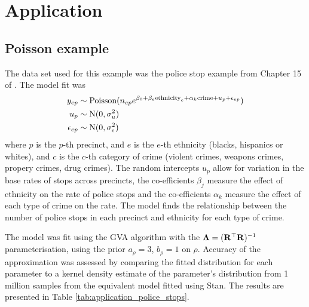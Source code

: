 \documentclass{amsart}[12pt]
\begin{document}
			\section{Application}
			\label{sec:application}
			
			\subsection{Poisson example}
			The data set used for this example was the police stop example from Chapter 15 of \citep{Gelman2007}.
			The model fit was
			\begin{align*}
				y_{ep}        & \sim \text{Poisson}(n_{ep} e^{\beta_0 + \beta_e \text{ethnicity}_e + \alpha_{k} \text{crime} + u_p + \epsilon_{ep}}) \\
				u_p           & \sim \text{N}(0, \sigma_u^2)                                                                                               \\
				\epsilon_{ep} & \sim \text{N}(0, \sigma_\epsilon^2)                                                                                        
			\end{align*}
			where $p$ is the $p$-th precinct, and $e$ is the $e$-th ethnicity (blacks, hispanics or whites), and $c$ is
			the $c$-th category of crime (violent crimes, weapons crimes, propery crimes, drug crimes). The random 
			intercepts $u_p$ allow for variation in the base rates of stops across precincts,
			the co-efficients $\beta_j$ measure the effect of ethnicity on the rate of police stops and
			the co-efficients $\alpha_k$ measure the effect of each type of crime on the rate.
			The model finds the relationship between the number of police stops in each precinct and 
			ethnicity	for each type of crime.
			
			The model was fit using the GVA algorithm with the ${\boldsymbol \Lambda} = ({\bf R}^\top {\bf R})^{-1}$ parameterisation, using
			the prior $a_\rho = 3$, $b_\rho = 1$ on $\rho$. Accuracy of the approximation was assessed by comparing the
			fitted distribution for each parameter to a kernel density estimate of the parameter's distribution from
			1 million samples from the equivalent model fitted using Stan. The results are presented in Table
			\ref{tab:application_police_stops}.
			
\end{document}
